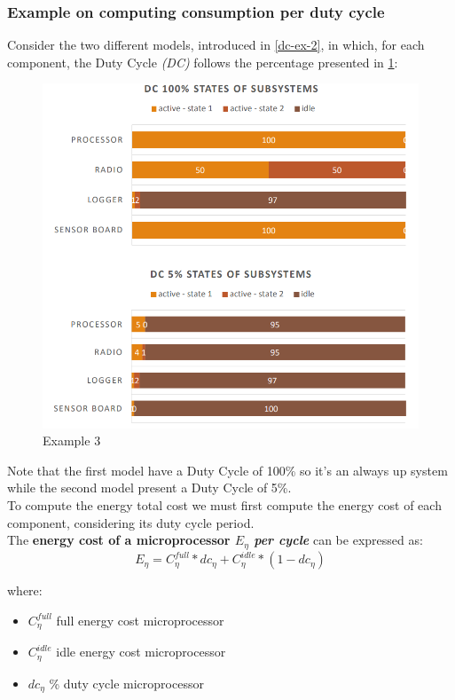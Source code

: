 \documentclass[10pt,a4paper]{report}
\theoremstyle{definition}
\begin{document}
\subsubsection{Example on computing consumption per duty cycle}\label{sec:example-on-computing-consumption-per-duty-cycle}
Consider the two different models, introduced in \ref{dc-ex-2}, in which, for each component, the Duty Cycle \textit{(DC)} follows the percentage presented in \ref{dc-ex-3}:
\begin{figure}[h]
	\centering\includegraphics[scale=0.30]{images/Pasted image 20230327151219.png}
	\caption{Example 3}
	\label{dc-ex-3}
\end{figure}
Note that the first model have a Duty Cycle of 100\% so it's an always up system while the second model present a Duty Cycle of 5\%.\\
To compute the energy total cost we must first compute the energy cost of each component, considering its duty cycle period.\\
The \textbf{energy cost of a microprocessor $E_{\eta}$ \textit{per cycle}} can be expressed as:
\begin{equation}
	E_{\eta} = C_{\eta}^{full}*dc_{\eta} + C_{\eta}^{idle}*(1-dc_{\eta})
\end{equation}

where:
\begin{itemize}
	\item 
	$C_{\eta}^{full}$ full energy cost microprocessor
	\item 
	$C_{\eta}^{idle}$ idle energy cost microprocessor
	\item 
	$dc_{\eta}$ \% duty cycle microprocessor
\end{itemize}
\end{document}
